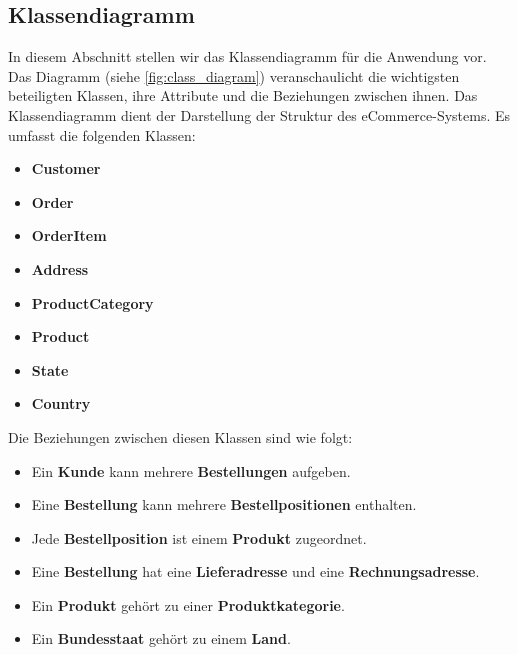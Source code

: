 \subsection{Klassendiagramm}

In diesem Abschnitt stellen wir das Klassendiagramm für die Anwendung vor. Das Diagramm (siehe \ref{fig:class_diagram}) veranschaulicht die wichtigsten beteiligten Klassen, ihre Attribute und die Beziehungen zwischen ihnen.
Das Klassendiagramm dient der Darstellung der Struktur des eCommerce-Systems. Es umfasst die folgenden Klassen:

\begin{itemize}
	\item \textbf{Customer}
	\item \textbf{Order}
	\item \textbf{OrderItem}
	\item \textbf{Address}
	\item \textbf{ProductCategory}
	\item \textbf{Product}
	\item \textbf{State}
	\item \textbf{Country}
\end{itemize}

Die Beziehungen zwischen diesen Klassen sind wie folgt:

\begin{itemize}
	\item Ein \textbf{Kunde} kann mehrere \textbf{Bestellungen} aufgeben.
	\item Eine \textbf{Bestellung} kann mehrere \textbf{Bestellpositionen} enthalten.
	\item Jede \textbf{Bestellposition} ist einem \textbf{Produkt} zugeordnet.
	\item Eine \textbf{Bestellung} hat eine \textbf{Lieferadresse} und eine \textbf{Rechnungsadresse}.
	\item Ein \textbf{Produkt} gehört zu einer \textbf{Produktkategorie}.
	\item Ein \textbf{Bundesstaat} gehört zu einem \textbf{Land}.
\end{itemize}

